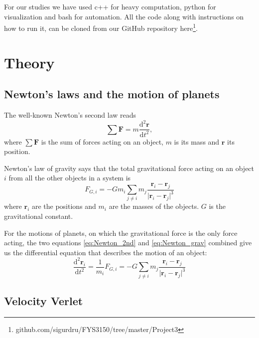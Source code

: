 \documentclass[reprint, english,notitlepage,nofootinbib]{revtex4-1}  %
\newcommand{\vc}[1]{\mathbf{#1}}
\begin{document}
For our studies we have used c++ for heavy computation, python for visualization and bash for automation. All the code along with instructions on how to run it, can be cloned from our GitHub repository here\footnote{github.com/sigurdru/FYS3150/tree/master/Project3}.



\section{Theory}

\subsection{Newton's laws and the motion of planets}

The well-known Newton's second law reads
\begin{equation}
  \label{eq:Newton_2nd}
  \sum \vc F = m \frac{\mathrm d^2 \vc r}{\mathrm d t^2},
\end{equation}
where $\sum \vc F$ is the sum of forces acting on an object, $m$ is its mass and $\vc r$ its position.

Newton's law of gravity says that the total gravitational force acting on an object $i$ from all the other objects in a system is
\begin{equation}
  \label{eq:Newton_grav}
  F_{G, i} = - G m_i \sum_{j \neq i} m_j \frac{\vc r_i - \vc r_j}{ \lvert \vc r_i - \vc r_j \rvert ^3}
\end{equation}
where $\vc r_i$ are the positions and $m_i$ are the masses of the objects. $G$ is the gravitational constant.

For the motions of planets, on which the gravitational force is the only force acting, the two equations \eqref{eq:Newton_2nd} and \eqref{eq:Newton_grav} combined give us the differential equation that describes the motion of an object:
\begin{equation}
  \label{eq:DE}
  \frac{\mathrm d^2 \vc r_i}{\mathrm d t^2} = \frac{1}{m_i} F_{G, i} = - G \sum_{j \neq i} m_j \frac{\vc r_i - \vc r_j}{ \lvert \vc r_i - \vc r_j \rvert ^3}
\end{equation}


\subsection{Velocity Verlet}
\end{document}

